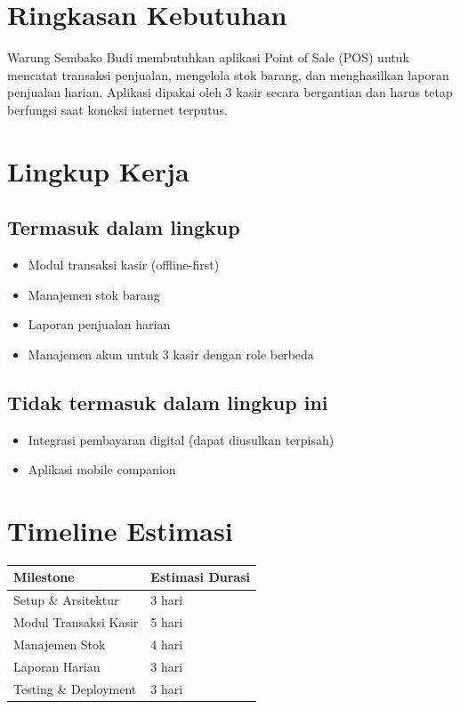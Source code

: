\documentclass[11pt]{article}
\begin{document}


\section{Ringkasan Kebutuhan}
Warung Sembako Budi membutuhkan aplikasi Point of Sale (POS) untuk mencatat
transaksi penjualan, mengelola stok barang, dan menghasilkan laporan
penjualan harian. Aplikasi dipakai oleh 3 kasir secara bergantian dan harus
tetap berfungsi saat koneksi internet terputus.

\section{Lingkup Kerja}
\subsection*{Termasuk dalam lingkup}
\begin{itemize}[leftmargin=1.4em]
  \item Modul transaksi kasir (offline-first)
  \item Manajemen stok barang
  \item Laporan penjualan harian
  \item Manajemen akun untuk 3 kasir dengan role berbeda
\end{itemize}

\subsection*{Tidak termasuk dalam lingkup ini}
\begin{itemize}[leftmargin=1.4em]
  \item Integrasi pembayaran digital (dapat diusulkan terpisah)
  \item Aplikasi mobile companion
\end{itemize}

\section{Timeline Estimasi}
\begin{center}
\begin{tabular}{@{}p{5.5cm}p{4cm}@{}}
\toprule
\textbf{Milestone} & \textbf{Estimasi Durasi} \\
\midrule
Setup \& Arsitektur & 3 hari \\
Modul Transaksi Kasir & 5 hari \\
Manajemen Stok & 4 hari \\
Laporan Harian & 3 hari \\
Testing \& Deployment & 3 hari \\
\bottomrule
\end{tabular}
\end{center}
\end{document}
